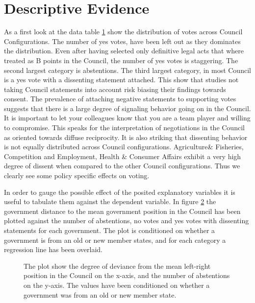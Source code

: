 \section{Descriptive Evidence}
As a first look at the data table \ref{fig:depvar} show the distribution of votes across Council Configurations. The number of yes votes, have been left out as they dominates the distribution. Even after having selected only definitive legal acts that where treated as B points in the Council, the number of yes votes is staggering. The second largest category is abstentions. The third largest category, in most Council is a yes vote with a dissenting statement attached. This show that studies not taking Council statements into account risk biasing their findings towards consent. The prevalence of attaching negative statements to supporting votes suggests that there is a large degree of signaling behavior going on in the Council. It is important to let your colleagues know that you are a team player and willing to compromise. This speaks for the interpretation of negotiations in the Council as oriented towards diffuse reciprocity. It is also striking that dissenting behavior is not equally distributed across Council configurations. Agriculture\& Fisheries, Competition and Employment, Health \& Consumer Affairs exhibit a very high degree of dissent when compared to the other Council configurations. Thus we clearly see some policy specific effects on voting.

\begin{figure}[htp]
\centering
\scalebox{.6}{}
\caption{}
\label{fig:depvar}
\end{figure}

In order to gauge the possible effect of the posited explanatory variables it is useful to tabulate them against the dependent variable. In figure \ref{fig:scatter} the government distance to the mean government position in the Council has been plotted against the number of abstentions, no votes and yes votes with dissenting statements for each government. The plot is conditioned on whether a government is from an old or new member states, and for each category a regression line has been overlaid. 

\begin{figure}[htp]
\centering
\scalebox{.6}{\subfloat[][]{}}\quad
\scalebox{.6}{\subfloat[][]{}}\quad
\scalebox{.6}{\subfloat[][]{}}\quad
\caption{The plot show the degree of deviance from the mean left-right position in the Council on the x-axis, and the number of abstentions on the y-axis. The values have been conditioned on whether a government was from an old or new member state.}
\label{fig:scatter}
\end{figure}

